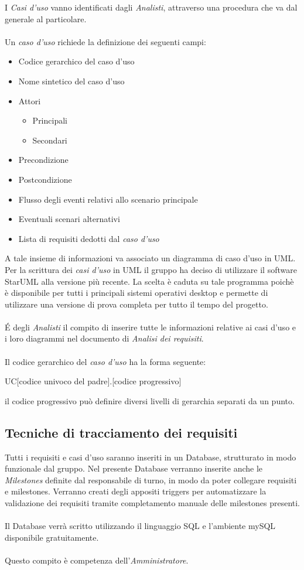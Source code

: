\documentclass[a4paper]{report}
\begin{document}
		 I \emph{Casi d'uso} vanno identificati dagli \emph{Analisti}, attraverso una procedura che va dal generale al
		  particolare. 
		  \\ \\
		 Un \emph{caso d'uso} richiede la definizione dei seguenti campi:
		 \begin{itemize}
		 	\item Codice gerarchico del caso d'uso
		 	\item Nome sintetico del caso d'uso
		 	\item Attori
		 	\begin{itemize}
		 		\item Principali
		 		\item Secondari
		 	\end{itemize}
		 	\item Precondizione
		 	\item Postcondizione
		 	\item Flusso degli eventi relativi allo scenario principale
		 	\item Eventuali scenari alternativi
		 	\item Lista di requisiti dedotti dal \emph{caso d'uso}
		 \end{itemize}
		 A tale insieme di informazioni va associato un diagramma di caso d'uso in UML. Per la scrittura dei
		  \emph{casi d'uso} in UML il gruppo ha deciso di utilizzare il software StarUML alla versione più recente. La scelta è 
		 caduta su tale programma poichè è disponibile per tutti i principali sistemi operativi desktop e permette di
		  utilizzare una versione di prova completa per tutto il tempo del progetto.
		  \\ \\
		  \'E degli \emph{Analisti} il compito di inserire tutte le informazioni relative ai casi d'uso e i loro diagrammi nel 
		  documento di \emph{Analisi dei requisiti}.
		  \\ \\
		 Il codice gerarchico del \emph{caso d'uso} ha la forma seguente:
		 \begin{center}
		 	UC[codice univoco del padre].[codice progressivo]
		 \end{center}
		 il codice progressivo può definire diversi livelli di gerarchia separati da un punto.
	\subsection{Tecniche di tracciamento dei requisiti}
	Tutti i requisiti e casi d'uso saranno inseriti in un Database, strutturato in modo funzionale dal gruppo. Nel presente Database verranno
	inserite anche le \emph{Milestones} definite dal responsabile di turno, in modo da poter collegare requisiti e milestones. 
	Verranno creati degli appositi triggers per automatizzare la validazione dei requisiti tramite completamento manuale delle
	milestones presenti. 
	\\ \\ 
	Il Database verrà scritto utilizzando il linguaggio SQL e l'ambiente mySQL disponibile gratuitamente.
	\\ \\
	Questo compito è competenza dell'\emph{Amministratore}.
\end{document}
